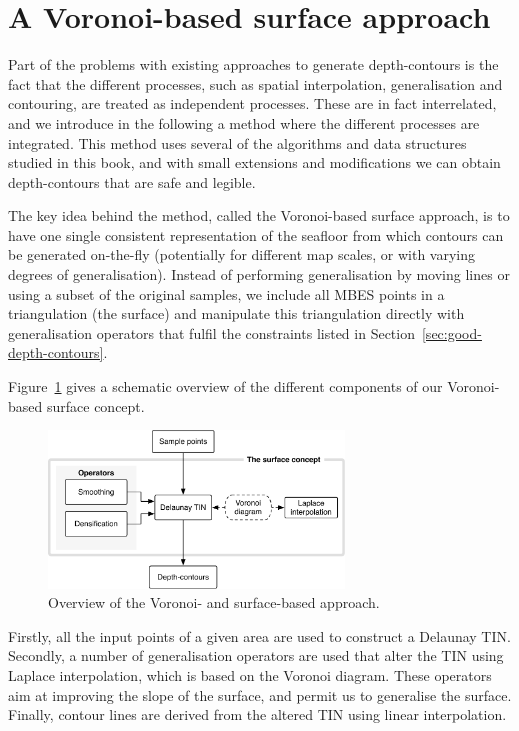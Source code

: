 %
\section{A Voronoi-based surface approach}

Part of the problems with existing approaches to generate depth-contours is the fact that the different processes, such as spatial interpolation, generalisation and contouring, are treated as independent processes.
These are in fact interrelated, and we introduce in the following a method where the different processes are integrated.
This method uses several of the algorithms and data structures studied in this book, and with small extensions and modifications we can obtain depth-contours that are safe and legible.

%

The key idea behind the method, called the Voronoi-based surface approach, is to have one single consistent representation of the seafloor from which contours can be generated on-the-fly (potentially for different map scales, or with varying degrees of generalisation).
Instead of performing generalisation by moving lines or using a subset of the original samples, we include all MBES points in a triangulation (the surface) and manipulate this triangulation directly with generalisation operators that fulfil the constraints listed in Section~\ref{sec:good-depth-contours}.

%

Figure~\ref{fig:surfapproach} gives a schematic overview of the different components of our Voronoi-based surface concept. 
\begin{figure}
  \centering
  \includegraphics[width=0.7\textwidth]{figs/surfaceapproach_V2.pdf}
  \caption{Overview of the Voronoi- and surface-based approach.}
\label{fig:surfapproach}
\end{figure}

Firstly, all the input points of a given area are used to construct a Delaunay TIN.
Secondly, a number of generalisation operators are used that alter the TIN using Laplace interpolation, which is based on the Voronoi diagram.
These operators aim at improving the slope of the surface, and permit us to generalise the surface.
Finally, contour lines are derived from the altered TIN using linear interpolation.


